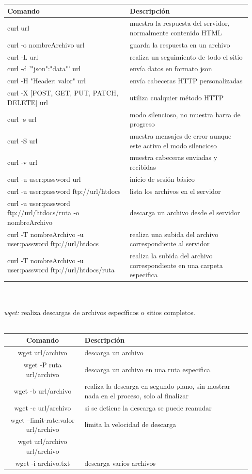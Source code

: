 \documentclass[10pt,a4paper,titlepage]{article}
\begin{document}
	\begin{tabular}{|p{7cm}|p{7cm}|}
		\hline
		Comando & Descripción \\
		\hline
		curl url & muestra la respuesta del servidor, normalmente contenido HTML \\
		\hline
		curl -o nombreArchivo url & guarda la respuesta en un archivo \\
		\hline
		curl -L url & realiza un seguimiento de todo el sitio \\
		\hline
		curl -d '{"json":"data"}' url & envía datos en formato json \\
		\hline
		curl -H "Header: valor" url & envía cabeceras HTTP personalizadas \\
		\hline
		curl -X [POST, GET, PUT, PATCH, DELETE] url & utiliza cualquier método HTTP \\
		\hline
		curl -s url & modo silencioso, no muestra barra de progreso \\
		\hline
		curl -S url & muestra mensajes de error aunque este activo el modo silencioso \\
		\hline
		curl -v url & muestra cabeceras enviadas y recibidas \\
		\hline
		curl -u user:password url & inicio de sesión básico \\
		\hline
		curl -u user:password ftp://url/htdocs & lista los archivos en el servidor \\
		\hline
		curl -u user:password ftp://url/htdocs/ruta -o nombreArchivo & descarga un archivo desde el servidor \\
		\hline
		curl -T nombreArchivo -u user:password ftp://url/htdocs & realiza una subida del archivo correspondiente al servidor \\
		\hline
		curl -T nombreArchivo -u user:password ftp://url/htdocs/ruta & realiza la subida del archivo correspondiente en una carpeta especifica \\
		\hline
	\end{tabular}
	\\
	\\
	\emph{wget:} realiza descargas de archivos específicos o sitios completos.
	\\
	\\
	\begin{tabular}{|c|p{8cm}|}
		\hline
		Comando & Descripción \\
		\hline
		wget url/archivo & descarga un archivo \\
		\hline
		wget -P ruta url/archivo & descarga un archivo en una ruta especifica \\
		\hline
		wget -b url/archivo & realiza la descarga en segundo plano, sin mostrar nada en el proceso, solo al finalizar \\
		\hline
		wget -c url/archivo & si se detiene la descarga se puede reanudar \\
		\hline
		wget --limit-rate:valor url/archivo & limita la velocidad de descarga \\
		\hline
		wget url/archivo url/archivo \\ wget -i archivo.txt & descarga varios archivos \\
		\hline
	\end{tabular}
\end{document}
